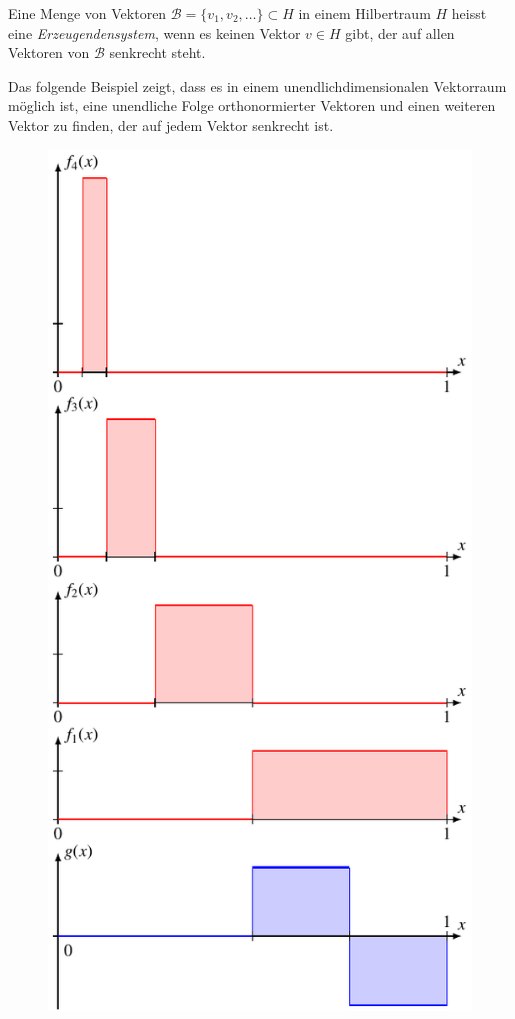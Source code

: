 \begin{definition}
\label{geometrie:erzeugendensystem}
Eine Menge von Vektoren $\mathcal{B} = \{v_1,v_2,\dots\}\subset H$ in einem
Hilbertraum $H$ heisst eine {\em Erzeugendensystem}, wenn es keinen Vektor
%
$v\in H$ gibt, der auf allen Vektoren von $\mathcal{B}$ senkrecht steht.
\end{definition}

Das folgende Beispiel zeigt, dass es in einem unendlichdimensionalen
Vektorraum möglich ist, eine unendliche Folge orthonormierter Vektoren
und einen weiteren Vektor zu finden, der auf jedem Vektor senkrecht ist.

\begin{beispiel}
\label{geometrie:l2-beispiel}
\begin{figure}
\centering
\includegraphics{chapters/1-geometrie/images/l2orth.pdf}

\end{figure}
\end{beispiel}
